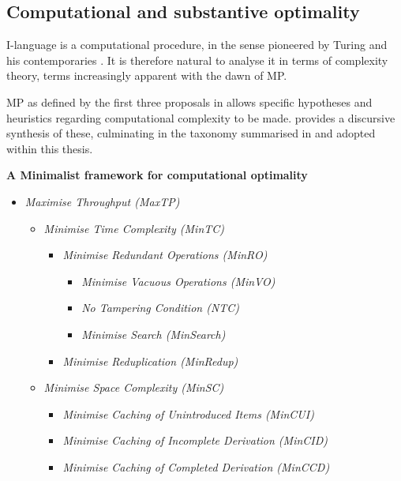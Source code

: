 \subsection{Computational and substantive optimality}\label{sec:130}

I-language is a computational procedure, in the sense pioneered by Turing and his contemporaries \parencite{TuringAM_1936}. It is therefore natural to analyse it in terms of complexity theory, terms increasingly apparent with the dawn of MP.

MP as defined by the first three proposals in  allows specific hypotheses and heuristics regarding computational complexity to be made. \textcite{MobbsI_2015} provides a discursive synthesis of these, culminating in the taxonomy summarised in  and adopted within this thesis.

\begin{example}\label{ex:mobbscompopt}
    \textbf{A Minimalist framework for computational optimality} \parencite{MobbsI_2015}
    \begin{itemize}
        \item \textit{Maximise Throughput (MaxTP)}
        \begin{itemize}
            \item \textit{Minimise Time Complexity (MinTC)}
            \begin{itemize}
                \item \textit{Minimise Redundant Operations (MinRO)}
                \begin{itemize}
                    \item \textit{Minimise Vacuous Operations (MinVO)}
                    \item \textit{No Tampering Condition (NTC)}
                    \item \textit{Minimise Search (MinSearch)}
                \end{itemize}
                \item \textit{Minimise Reduplication (MinRedup)}
            \end{itemize}
            \item \textit{Minimise Space Complexity (MinSC)}
            \begin{itemize}
                \item \textit{Minimise Caching of Unintroduced Items (MinCUI)}
                \item \textit{Minimise Caching of Incomplete Derivation (MinCID)}
                \item \textit{Minimise Caching of Completed Derivation (MinCCD)}
            \end{itemize}
        \end{itemize}
    \end{itemize}
\end{example}

